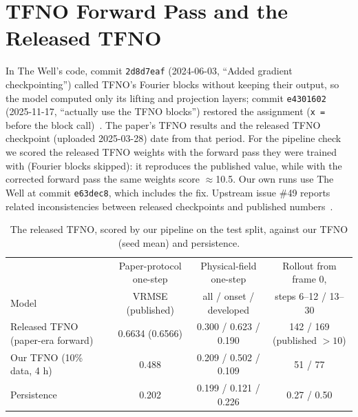 \documentclass[11pt]{article}
\begin{document}
\FloatBarrier
\section{TFNO Forward Pass and the Released TFNO}
\label{app:tfno}
In The Well's code, commit \texttt{2d8d7eaf} (2024-06-03, ``Added gradient checkpointing'') called TFNO's Fourier
blocks without keeping their output, so the model computed only its lifting and projection layers; commit
\texttt{e4301602} (2025-11-17, ``actually use the TFNO blocks'') restored the assignment (\texttt{x =}
before the block call)~\cite{wellfix}. The paper's TFNO results and the released TFNO checkpoint (uploaded
2025-03-28) date from that period. For the pipeline check we scored the released TFNO weights with the forward
pass they were trained with (Fourier blocks skipped): it reproduces the published value, while with the corrected
forward pass the same weights score $\approx$10.5. Our own runs use The Well at commit \texttt{e63dec8}, which
includes the fix. Upstream issue \#49 reports related inconsistencies between released checkpoints and published
numbers~\cite{wellissue}.

\begin{table}[!htbp]
\centering\footnotesize
\begin{tabular}{@{}lccc@{}}
\toprule
& Paper-protocol one-step & Physical-field one-step & Rollout from frame 0, \\
Model & VRMSE (published) & all / onset / developed & steps 6--12 / 13--30 \\
\midrule
Released TFNO (paper-era forward) & 0.6634 (0.6566) & 0.300 / 0.623 / 0.190 & 142 / 169 (published $>10$) \\
Our TFNO (10\% data, 4 h) & 0.488 & 0.209 / 0.502 / 0.109 & 51 / 77 \\
Persistence & 0.202 & 0.199 / 0.121 / 0.226 & 0.27 / 0.50 \\
\bottomrule
\end{tabular}
\caption{The released TFNO, scored by our pipeline on the test split, against our TFNO (seed mean) and
persistence.}
\label{tab:released_tfno}
\end{table}
\end{document}
